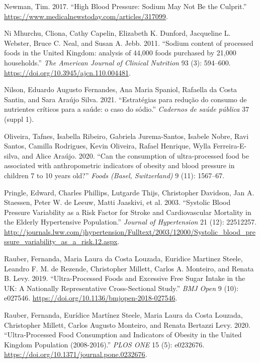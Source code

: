 \documentclass[
]{article}
\newlength{\cslhangindent}
\newlength{\cslentryspacingunit} %
\newenvironment{CSLReferences}[2] %
 {%
  \setlength{\parindent}{0pt}
  \ifodd #1
  \let\oldpar\par
  \def\par{\hangindent=\cslhangindent\oldpar}
  \fi
  \setlength{\parskip}{#2\cslentryspacingunit}
 }%
 {}
\begin{document}
\begin{CSLReferences}{1}{0}
\leavevmode{}%
Newman, Tim. 2017. {``High Blood Pressure: Sodium May Not Be the
Culprit.''} \url{https://www.medicalnewstoday.com/articles/317099}.

\leavevmode{}%
Ni Mhurchu, Cliona, Cathy Capelin, Elizabeth K. Dunford, Jacqueline L.
Webster, Bruce C. Neal, and Susan A. Jebb. 2011. {``Sodium content of
processed foods in the United Kingdom: analysis of 44,000 foods
purchased by 21,000 households.''} \emph{The American Journal of
Clinical Nutrition} 93 (3): 594--600.
\url{https://doi.org/10.3945/ajcn.110.004481}.

\leavevmode{}%
Nilson, Eduardo Augusto Fernandes, Ana Maria Spaniol, Rafaella da Costa
Santin, and Sara Araújo Silva. 2021. {``Estratégias para redução do
consumo de nutrientes críticos para a saúde: o caso do sódio.''}
\emph{Cadernos de saúde pública} 37 (suppl 1).

\leavevmode{}%
Oliveira, Tafnes, Isabella Ribeiro, Gabriela Jurema-Santos, Isabele
Nobre, Ravi Santos, Camilla Rodrigues, Kevin Oliveira, Rafael Henrique,
Wylla Ferreira-E-silva, and Alice Araújo. 2020. {``Can the consumption
of ultra-processed food be associated with anthropometric indicators of
obesity and blood pressure in children 7 to 10 years old?''} \emph{Foods
(Basel, Switzerland)} 9 (11): 1567--67.

\leavevmode{}%
Pringle, Edward, Charles Phillips, Lutgarde Thijs, Christopher Davidson,
Jan A. Staessen, Peter W. de Leeuw, Matti Jaaskivi, et al. 2003.
{``Systolic Blood Pressure Variability as a Risk Factor for Stroke and
Cardiovascular Mortality in the Elderly Hypertensive Population.''}
\emph{Journal of Hypertension} 21 (12): 22512257.
\url{http://journals.lww.com/jhypertension/Fulltext/2003/12000/Systolic_blood_pressure_variability_as_a_risk.12.aspx}.

\leavevmode{}%
Rauber, Fernanda, Maria Laura da Costa Louzada, Euridice Martinez
Steele, Leandro F. M. de Rezende, Christopher Millett, Carlos A.
Monteiro, and Renata B. Levy. 2019. {``Ultra-Processed Foods and
Excessive Free Sugar Intake in the UK: A Nationally Representative
Cross-Sectional Study.''} \emph{BMJ Open} 9 (10): e027546.
\url{https://doi.org/10.1136/bmjopen-2018-027546}.

\leavevmode{}%
Rauber, Fernanda, Eurídice Martínez Steele, Maria Laura da Costa
Louzada, Christopher Millett, Carlos Augusto Monteiro, and Renata
Bertazzi Levy. 2020. {``Ultra-Processed Food Consumption and Indicators
of Obesity in the United Kingdom Population (2008-2016).''} \emph{PLOS
ONE} 15 (5): e0232676.
\url{https://doi.org/10.1371/journal.pone.0232676}.


\end{CSLReferences}
\end{document}
